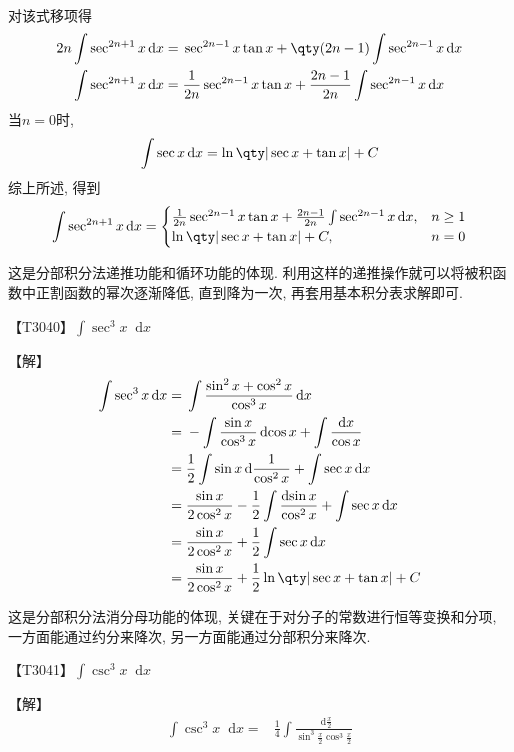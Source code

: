 \documentclass{ctexbook}
\newcommand*{\dif}{\mathop{}\!\mathrm{d}}
\begin{document}
{\begin{align*}
\end{align*}
对该式移项得
\begin{align*}
2n\int\sec^{2n+1}{x}\dif{x}={}&\sec^{2n-1}{x}\tan{x}+\qty(2n-1)\int\sec^{2n-1}{x}\dif{x}\\
\int\sec^{2n+1}{x}\dif{x}={}&\frac{1}{2n}\sec^{2n-1}{x}\tan{x}+\frac{2n-1}{2n}\int\sec^{2n-1}{x}\dif{x}
\end{align*}
当$n=0$时, 
\begin{align*}
\int\sec{x}\dif{x}=\ln\qty|\sec{x}+\tan{x}|+C
\end{align*}
综上所述, 得到
\begin{align*}
\int\sec^{2n+1}{x}\dif{x}=\begin{cases}
\frac{1}{2n}\sec^{2n-1}{x}\tan{x}+\frac{2n-1}{2n}\int\sec^{2n-1}{x}\dif{x},&n\ge1\\
\ln\qty|\sec{x}+\tan{x}|+C,&n=0
\end{cases}
\end{align*}\par
{\kaishu 这是分部积分法递推功能和循环功能的体现. 利用这样的递推操作就可以将被积函数中正割函数的幂次逐渐降低, 直到降为一次, 再套用基本积分表求解即可. \par}
{\color{red}【T3040】}$\int\sec^{3}{x}\dif{x}$\par
【解】
\begin{align*}
\int\sec^{3}{x}\dif{x}={}&\int\frac{\sin^{2}{x}+\cos^{2}{x}}{\cos^{3}{x}}\dif{x}\\
={}&-\int\frac{\sin{x}}{\cos^{3}{x}}\dif{\cos{x}}+\int\frac{\dif{x}}{\cos{x}}\\
={}&\frac{1}{2}\int\sin{x}\dif{\frac{1}{\cos^{2}{x}}}+\int\sec{x}\dif{x}\\
={}&\frac{\sin{x}}{2\cos^{2}{x}}-\frac{1}{2}\int\frac{\dif{\sin{x}}}{\cos^{2}{x}}+\int\sec{x}\dif{x}\\
={}&\frac{\sin{x}}{2\cos^{2}{x}}+\frac{1}{2}\int\sec{x}\dif{x}\\
={}&\frac{\sin{x}}{2\cos^{2}{x}}+\frac{1}{2}\ln\qty|\sec{x}+\tan{x}|+C
\end{align*}\par
{\kaishu 这是分部积分法消分母功能的体现, 关键在于对分子的常数进行恒等变换和分项, 一方面能通过约分来降次, 另一方面能通过分部积分来降次. \par}
{\color{red}【T3041】}$\int\csc^{3}{x}\dif{x}$\par
【解】
\begin{align*}
\int\csc^{3}{x}\dif{x}={}&\frac{1}{4}\int\frac{\dif{\frac{x}{2}}}{\sin^{3}{\frac{x}{2}}\cos^{3}{\frac{x}{2}}}\\

\end{align*}}
\end{document}
